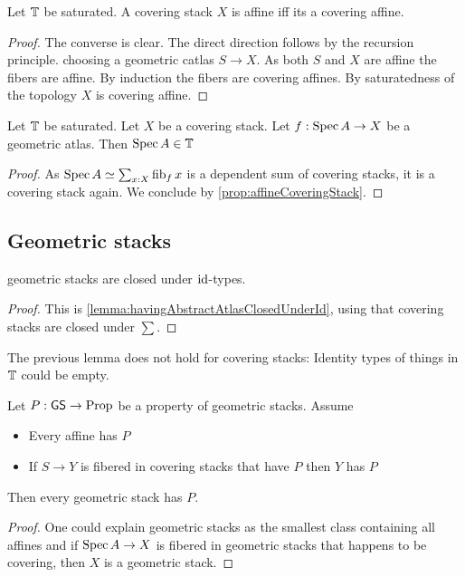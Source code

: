 \begin{prop}{\label{prop:affineCoveringStack}}
	Let $\mathbb{T}$ be saturated.
	A covering stack $X$ is affine iff its a covering affine.
\end{prop}
\begin{proof}
	The converse is clear. The direct direction follows by the recursion principle. choosing a geometric catlas  $S \to X$. As both $S$ and $X$ are affine the fibers are affine. By induction the fibers are covering affines. By saturatedness of the topology $X$ is covering affine.
\end{proof}
\begin{lemma}{\label{lemma:atlasIsCatlas}}
	Let $\mathbb{T}$ be saturated. Let $X$ be a covering stack. Let $f : \operatorname{Spec} A \to X$ be a geometric atlas. Then $\operatorname{Spec} A \in \mathbb{T}$
\end{lemma}
\begin{proof}
	As $\operatorname{Spec} A \simeq \sum_{x : X} \operatorname{fib}_f x$ is a dependent sum of covering stacks, it is a covering stack again. We conclude by \ref{prop:affineCoveringStack}.
\end{proof}	

\subsection{Geometric stacks}

\begin{lemma}{\label{lemma:geometricStacksClosedUnderId}}
	geometric stacks are closed under $\operatorname{id}$-types.
\end{lemma}
\begin{proof}
	
	This is \ref{lemma:havingAbstractAtlasClosedUnderId}, using that covering stacks are closed under $\sum$.
\end{proof}

\begin{warning}
	The previous lemma does not hold for covering stacks: Identity types of things in $\mathbb{T}$ could be empty.
\end{warning}
\begin{prop}
	Let $P : \mathsf{GS} \to \operatorname{Prop}$ be a property of geometric stacks. Assume
	\begin{itemize}
		\item Every affine has $P$
		\item If $S \to Y$ is fibered in covering stacks that have $P$ then $Y$ has $P$
	\end{itemize}
	Then every geometric stack has $P$.
\end{prop}
\begin{proof}
	One could explain geometric stacks as the smallest class containing all affines and if $\operatorname{Spec} A \to X$ is fibered in geometric stacks that happens to be covering, then $X$ is a geometric stack.
\end{proof}
